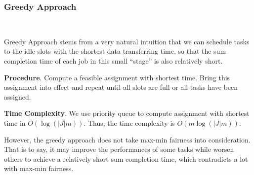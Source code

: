 \subsubsection{Greedy Approach}\label{Greedy Approach}
~

Greedy Approach stems from a very natural intuition that we can schedule tasks to the idle slots with the shortest data transferring time, so that the sum completion time of each job in this small ``stage'' is also relatively short. 


    

\textbf{Procedure}. Compute a feasible assignment with shortest time. Bring this assignment into effect and repeat until all slots are full or all tasks have been assigned.

\textbf{Time Complexity}. We use priority queue to compute assignment with shortest time in $O(\log (|J|m))$. Thus, the time complexity is $O(m\log (|J|m))$. 

However, the greedy approach does not take max-min fairness into consideration. That is to say, it may improve the performances of some tasks while worsen others to achieve a relatively short sum completion time, which contradicts a lot with max-min fairness.